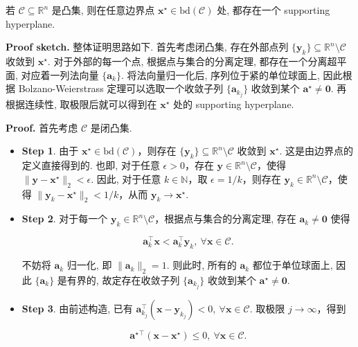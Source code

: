 \begin{thmblock}
若 $\mathcal{C} \subseteq \mathbb{R}^n$ 是凸集, 则在任意边界点 $\bm{x}^\star \in \text{bd}(\mathcal{C})$ 处, 都存在一个 supporting hyperplane.


\begin{proof*}{}
\textbf{Proof sketch.} 整体证明思路如下. 首先考虑闭凸集, 存在外部点列 $\{\bm{y}_k\} \subseteq \mathbb{R}^n \setminus \mathcal{C}$ 收敛到 $\bm{x}^\star$. 对于外部的每一个点, 根据点与集合的分离定理, 都存在一个分离超平面, 对应着一列法向量 $\{\bm{a}_k\}$. 将法向量归一化后, 序列位于紧的单位球面上, 因此根据 Bolzano-Weierstrass 定理可以选取一个收敛子列 $\{\bm{a}_{k_j}\}$ 收敛到某个 $\bm{a}^\star \neq \bm{0}$. 再根据连续性, 取极限后就可以得到在 $\bm{x}^\star$ 处的 supporting hyperplane.

\textbf{Proof.} 首先考虑 $\mathcal{C}$ 是闭凸集.

\begin{itemize}
\item {}\textbf{Step 1}. 由于 $\bm{x}^\star \in \text{bd}(\mathcal{C})$，则存在 $\{\bm{y}_k\} \subseteq \mathbb{R}^n \setminus \mathcal{C}$ 收敛到 $\bm{x}^\star$. 这是由边界点的定义直接得到的. 也即, 对于任意 $\epsilon > 0$，存在 $\bm{y} \in \mathbb{R}^n \setminus \mathcal{C}$，使得 $\|\bm{y}-\bm{x}^\star\|_2 < \epsilon$. 因此, 对于任意 $k \in \mathbb{N}$，取 $\epsilon = 1/k$，则存在 $\bm{y}_k \in \mathbb{R}^n \setminus \mathcal{C}$，使得 $\|\bm{y}_k - \bm{x}^\star\|_2 < 1/k$，从而 $\bm{y}_k \to \bm{x}^\star$.


\item {}\textbf{Step 2}. 对于每一个 $\bm{y}_k \in \mathbb{R}^n \setminus \mathcal{C}$，根据点与集合的分离定理, 存在 $\bm{a}_k \neq \bm{0}$ 使得

\[
\bm{a}_k^\top \bm{x} < \bm{a}_k^\top \bm{y}_k,~ \forall \bm{x} \in \mathcal{C}.
\]

不妨将 $\bm{a}_k$ 归一化, 即 $\|\bm{a}_k\|_2 = 1$. 则此时, 所有的 $\bm{a}_k$ 都位于单位球面上, 因此 $\{\bm{a}_k\}$ 是有界的, 故定存在收敛子列 $\{\bm{a}_{k_j}\}$ 收敛到某个 $\bm{a}^\star \neq \bm{0}$.


\item {}\textbf{Step 3}. 由前述构造, 已有 $\bm{a}_{k_j}^\top (\bm{x} - \bm{y}_{k_j}) < 0,~ \forall \bm{x} \in \mathcal{C}$. 取极限 $j \to \infty$，得到

\[
\bm{a}^\star{}^\top (\bm{x} - \bm{x}^\star) \leq 0,~ \forall \bm{x} \in \mathcal{C}.
\]


\end{itemize}
\end{proof*}
\end{thmblock}
